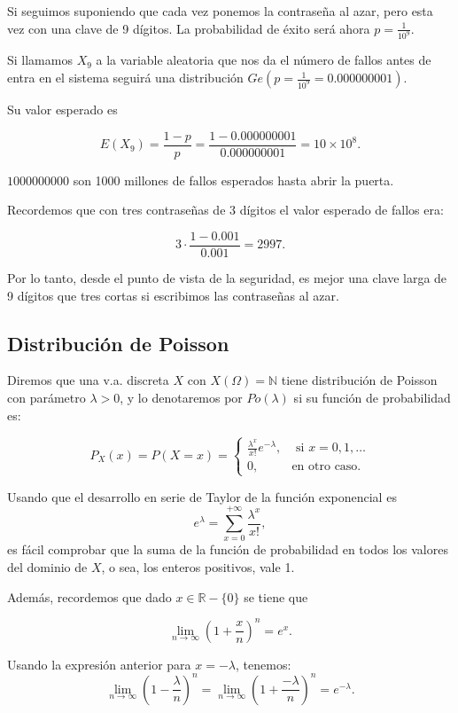 \documentclass[
  letterpaper,
  DIV=11,
  numbers=noendperiod]{scrreprt}
\begin{document}
Si seguimos suponiendo que cada vez ponemos la contraseña al azar, pero
esta vez con una clave de 9 dígitos. La probabilidad de éxito será ahora
\(p=\frac{1}{10^{9}}\).

Si llamamos \(X_9\) a la variable aleatoria que nos da el número de
fallos antes de entra en el sistema seguirá una distribución
\(Ge(p=\frac{1}{10^9}=0.000000001)\).

Su valor esperado es

\[
E(X_9)=\frac{1-p}{p}=\frac{1-0.000000001}{0.000000001}=\ensuremath{10\times 10^{8}}.
\]

\(1000 000 000\) son 1000 millones de fallos esperados hasta abrir la
puerta.

Recordemos que con tres contraseñas de 3 dígitos el valor esperado de
fallos era:

\[3\cdot \frac{1-0.001}{0.001}=2997.\]

Por lo tanto, desde el punto de vista de la seguridad, es mejor una
clave larga de 9 dígitos que tres cortas si escribimos las contraseñas
al azar.

\hypertarget{distribuciuxf3n-de-poisson}{%
\subsection{Distribución de Poisson}\label{distribuciuxf3n-de-poisson}}

Diremos que una v.a. discreta \(X\) con \(X(\Omega)=\mathbb{N}\) tiene
distribución de Poisson con parámetro \(\lambda>0\), y lo denotaremos
por \(Po(\lambda)\) si su función de probabilidad es:

\[
P_{X}(x)=P(X=x)=
\left\{\begin{array}{ll}
\frac{\lambda^x}{x!} e^{-\lambda},& \mbox{ si } x=0,1,\ldots\\
0, & \mbox{en otro caso.}\end{array}\right.
\]

Usando que el desarrollo en serie de Taylor de la función exponencial es
\[
e^{\lambda}=\sum_{x=0}^{+\infty} \frac{\lambda^x}{x!},
\] es fácil comprobar que la suma de la función de probabilidad en todos
los valores del dominio de \(X\), o sea, los enteros positivos, vale 1.

Además, recordemos que dado \(x\in\mathbb{R}-\{0\}\) se tiene que

\[
\lim_{n\to\infty} \left(1+\frac{x}{n}\right)^n=e^x.
\]

Usando la expresión anterior para \(x=-\lambda\), tenemos: \[
\lim_{n\to\infty} \left(1-\frac{\lambda}{n}\right)^n=\lim_{n\to\infty} \left(1+\frac{-\lambda}{n}\right)^n=e^{-\lambda}.
\]
\end{document}
